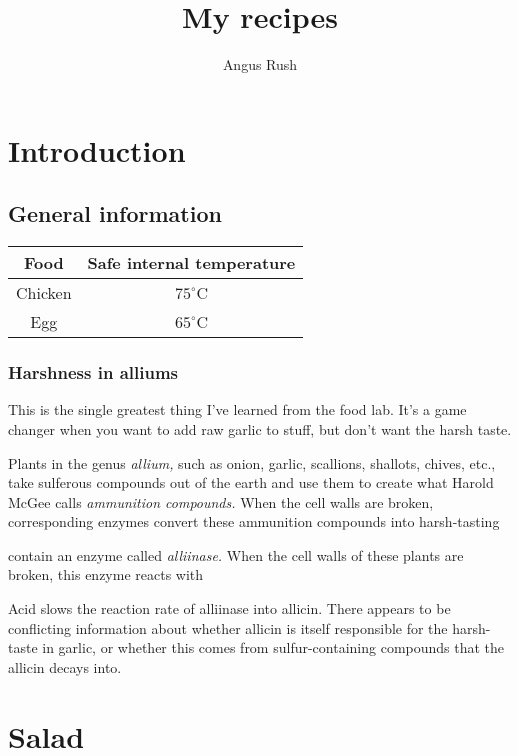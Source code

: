 \documentclass[a4paper,12pt]{scrreprt}
\title{My recipes}
\author{Angus Rush}
\theoremstyle{definition}
\theoremstyle{plain}
\theoremstyle{remark}
\begin{document}
\maketitle
\tableofcontents
\chapter{Introduction}

\section{General information}\label{sec:general_information}

\begin{tabular}{cc}
  Food & Safe internal temperature \\
  \midrule
  Chicken & $75^{\circ}$C \\
  Egg & $65^{\circ}$C
\end{tabular}

\subsection{Harshness in alliums}
\label{ssc:harshness_in_alliums}

This is the single greatest thing I've learned from the food lab. It's a game changer when you want to add raw garlic to stuff, but don't want the harsh taste.

Plants in the genus \emph{allium,} such as onion, garlic, scallions, shallots, chives, etc., take sulferous compounds out of the earth and use them to create what Harold McGee calls \emph{ammunition compounds.} When the cell walls are broken, corresponding enzymes convert these ammunition compounds into harsh-tasting

contain an enzyme called \emph{alliinase.} When the cell walls of these plants are broken, this enzyme reacts with

Acid slows the reaction rate of alliinase into allicin. There appears to be conflicting information about whether allicin is itself responsible for the harsh-taste in garlic, or whether this comes from sulfur-containing compounds that the allicin decays into.

\chapter{Salad}
\end{document}
